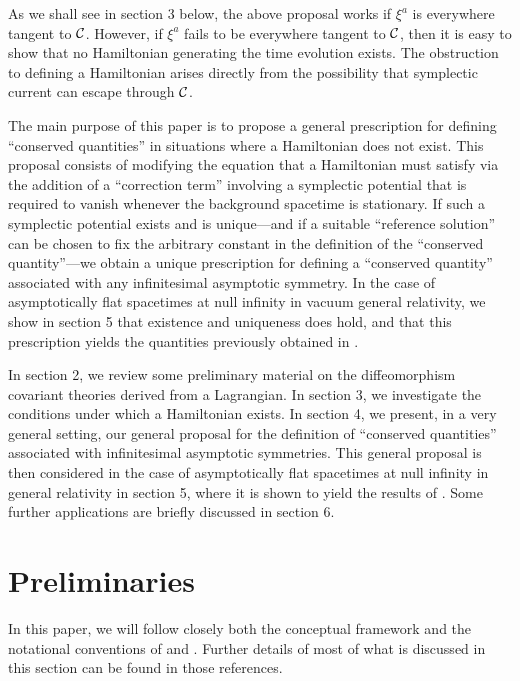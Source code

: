 As we shall see in section 3 below, the above proposal works if
$\xi^a$ is everywhere tangent to ${\cal C}$. However, if $\xi^a$ fails
to be everywhere tangent to ${\cal C}$, then it is easy to show that
no Hamiltonian generating the time evolution exists. The
obstruction to defining a Hamiltonian arises directly from the
possibility that symplectic current can escape through ${\cal C}$.

The main purpose of this paper is to propose a general prescription
for defining ``conserved quantities'' in situations where a
Hamiltonian does not exist. This proposal consists of modifying the
equation that a Hamiltonian must satisfy via the addition of a
``correction term'' involving a symplectic potential that is required
to vanish whenever the background spacetime is stationary. If such a
symplectic potential exists and is unique---and if a suitable
``reference solution'' can be chosen to fix the arbitrary constant in
the definition of the ``conserved quantity''---we obtain a unique
prescription for defining a ``conserved quantity'' associated with any
infinitesimal asymptotic symmetry. In the case of asymptotically flat
spacetimes at null infinity in vacuum general relativity, we show in
section 5 that existence and uniqueness does hold, and that this
prescription yields the quantities previously obtained in \cite{ds}.

In section 2, we review some preliminary material on the
diffeomorphism covariant theories derived from a Lagrangian. In
section 3, we investigate the conditions under which a Hamiltonian
exists. In section 4, we present, in a very general setting, our
general proposal for the definition of ``conserved quantities''
associated with infinitesimal asymptotic symmetries. This general
proposal is then considered in the case of asymptotically flat
spacetimes at null infinity in general relativity in section 5, where
it is shown to yield the results of \cite{ds}. Some further
applications are briefly discussed in section 6.



\section{Preliminaries}

In this paper, we will follow closely both the conceptual framework
and the notational conventions of \cite {lw} and \cite{iw}. Further
details of most of what is discussed in this section can be found in those
references.

